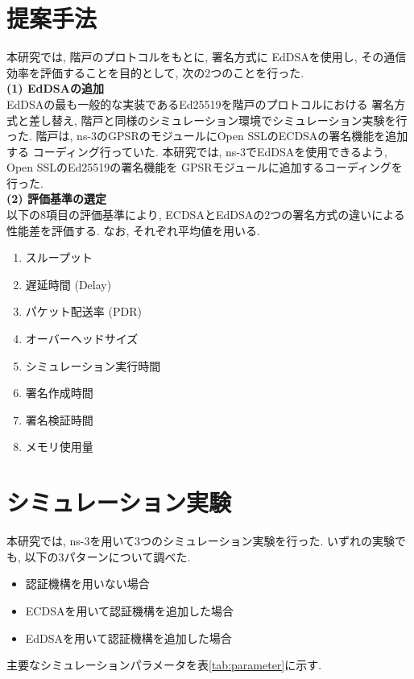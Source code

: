 \documentclass[a4j,9pt,twocolumn]{jsarticle}
\begin{document}
\section{提案手法}
\indent 本研究では, 階戸のプロトコル\cite{shinato}をもとに, 署名方式に
EdDSAを使用し, その通信効率を評価することを目的として, 次の2つのことを行った.\\ 
\noindent\textbf{(1) EdDSAの追加}\\
\indent EdDSAの最も一般的な実装であるEd25519を階戸のプロトコルにおける
署名方式と差し替え, 階戸と同様のシミュレーション環境でシミュレーション実験を行った. 
階戸は, ns-3のGPSRのモジュールにOpen SSLのECDSAの署名機能を追加する
コーディング行っていた. 本研究では, ns-3でEdDSAを使用できるよう, Open SSLのEd25519の署名機能を
GPSRモジュールに追加するコーディングを行った. \\
\noindent\textbf{(2) 評価基準の選定}\\
\indent 以下の8項目の評価基準により, ECDSAとEdDSAの2つの署名方式の違いによる
性能差を評価する.  なお, それぞれ平均値を用いる.
\vspace{-3mm}
\setlength{\columnsep}{10pt} %
\begin{multicols}{2}
    \begin{enumerate}
        \item スループット 
        \item 遅延時間 (Delay)
        \item パケット配送率 (PDR)
        \item オーバーヘッドサイズ\\
        \item シミュレーション実行時間
        \item 署名作成時間
        \item 署名検証時間
        \item メモリ使用量
    \end{enumerate}
\end{multicols}
\vspace{-3mm}
\section{シミュレーション実験}
\indent 本研究では, ns-3を用いて3つのシミュレーション実験を行った.  
いずれの実験でも, 以下の3パターンについて調べた. 
\begin{itemize}
    \item 認証機構を用いない場合
    \item ECDSAを用いて認証機構を追加した場合
    \item EdDSAを用いて認証機構を追加した場合
\end{itemize}
\indent 主要なシミュレーションパラメータを表\ref{tab:parameter}に示す. 
\end{document}
